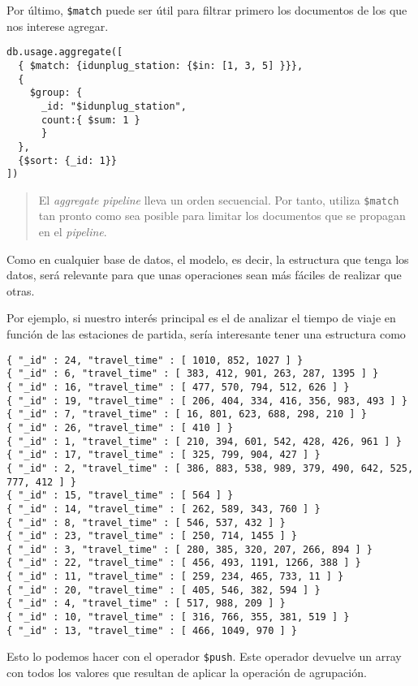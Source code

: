 \documentclass[]{article}
\begin{document}
Por último, \texttt{\$match} puede ser útil para filtrar primero los
documentos de los que nos interese agregar.

\begin{verbatim}
db.usage.aggregate([
  { $match: {idunplug_station: {$in: [1, 3, 5] }}},
  {
    $group: {
      _id: "$idunplug_station",
      count:{ $sum: 1 }
      }
  },
  {$sort: {_id: 1}}
])
\end{verbatim}

\begin{quote}
El \emph{aggregate pipeline} lleva un orden secuencial. Por tanto,
utiliza \texttt{\$match} tan pronto como sea posible para limitar los
documentos que se propagan en el \emph{pipeline}.
\end{quote}

Como en cualquier base de datos, el modelo, es decir, la estructura que
tenga los datos, será relevante para que unas operaciones sean más
fáciles de realizar que otras.

Por ejemplo, si nuestro interés principal es el de analizar el tiempo de
viaje en función de las estaciones de partida, sería interesante tener
una estructura como

\begin{verbatim}
{ "_id" : 24, "travel_time" : [ 1010, 852, 1027 ] }
{ "_id" : 6, "travel_time" : [ 383, 412, 901, 263, 287, 1395 ] }
{ "_id" : 16, "travel_time" : [ 477, 570, 794, 512, 626 ] }
{ "_id" : 19, "travel_time" : [ 206, 404, 334, 416, 356, 983, 493 ] }
{ "_id" : 7, "travel_time" : [ 16, 801, 623, 688, 298, 210 ] }
{ "_id" : 26, "travel_time" : [ 410 ] }
{ "_id" : 1, "travel_time" : [ 210, 394, 601, 542, 428, 426, 961 ] }
{ "_id" : 17, "travel_time" : [ 325, 799, 904, 427 ] }
{ "_id" : 2, "travel_time" : [ 386, 883, 538, 989, 379, 490, 642, 525, 777, 412 ] }
{ "_id" : 15, "travel_time" : [ 564 ] }
{ "_id" : 14, "travel_time" : [ 262, 589, 343, 760 ] }
{ "_id" : 8, "travel_time" : [ 546, 537, 432 ] }
{ "_id" : 23, "travel_time" : [ 250, 714, 1455 ] }
{ "_id" : 3, "travel_time" : [ 280, 385, 320, 207, 266, 894 ] }
{ "_id" : 22, "travel_time" : [ 456, 493, 1191, 1266, 388 ] }
{ "_id" : 11, "travel_time" : [ 259, 234, 465, 733, 11 ] }
{ "_id" : 20, "travel_time" : [ 405, 546, 382, 594 ] }
{ "_id" : 4, "travel_time" : [ 517, 988, 209 ] }
{ "_id" : 10, "travel_time" : [ 316, 766, 355, 381, 519 ] }
{ "_id" : 13, "travel_time" : [ 466, 1049, 970 ] }
\end{verbatim}

Esto lo podemos hacer con el operador \texttt{\$push}. Este operador
devuelve un array con todos los valores que resultan de aplicar la
operación de agrupación.
\end{document}
